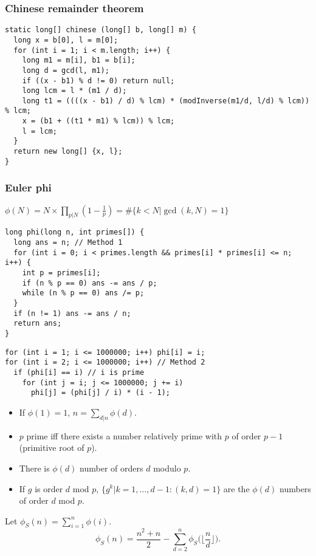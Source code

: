 \subsubsection{Chinese remainder theorem}
\begin{lstlisting}
static long[] chinese (long[] b, long[] m) {
  long x = b[0], l = m[0];
  for (int i = 1; i < m.length; i++) {
    long m1 = m[i], b1 = b[i];
    long d = gcd(l, m1);
    if ((x - b1) % d != 0) return null;
    long lcm = l * (m1 / d);
    long t1 = ((((x - b1) / d) % lcm) * (modInverse(m1/d, l/d) % lcm)) % lcm;
    x = (b1 + ((t1 * m1) % lcm)) % lcm;
    l = lcm;
  }
  return new long[] {x, l};
}
\end{lstlisting}

\subsubsection{Euler phi}
$\phi(N) = N \times \prod_{p | N} (1 - \frac{1}{p}) = \#\{k < N | \gcd(k,N) = 1\}$
\begin{lstlisting}
long phi(long n, int primes[]) {
  long ans = n; // Method 1
  for (int i = 0; i < primes.length && primes[i] * primes[i] <= n; i++) {
    int p = primes[i];
    if (n % p == 0) ans -= ans / p;
    while (n % p == 0) ans /= p;
  }
  if (n != 1) ans -= ans / n;
  return ans;
}
\end{lstlisting}
\begin{lstlisting}
for (int i = 1; i <= 1000000; i++) phi[i] = i;
for (int i = 2; i <= 1000000; i++) // Method 2
  if (phi[i] == i) // i is prime
    for (int j = i; j <= 1000000; j += i)
      phi[j] = (phi[j] / i) * (i - 1);
\end{lstlisting}

\begin{itemize}
  \item If $\phi(1) = 1$, $n = \sum_{d|n} \phi(d)$.
  \item $p$ prime iff there exists a number relatively prime with $p$ of order $p-1$ (primitive root of $p$).
  \item There is $\phi(d)$ number of orders $d$ modulo $p$.
  \item If $g$ is order $d$ mod $p$, $\{g^k | k=1,\ldots,d-1 : (k,d) = 1\}$ are the
    $\phi(d)$ numbers of order $d$ mod $p$.
\end{itemize}
Let $\phi_S(n) = \sum_{i=1}^n \phi(i)$.
\[ \phi_S(n) = \frac{n^2+n}{2} - \sum_{d=2}^n \phi_S\Big(\Big\lfloor\frac{n}{d}\Big\rfloor\Big). \]

